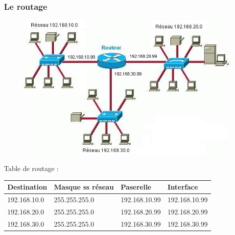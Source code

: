 \begin{frame}\frametitle{Le routage}

    \begin{figure}[H]
        \includegraphics[scale=0.35]{res/routageIP_1.png}
    \end{figure}
    Table de routage :
    \begin{table}[h]
        \begin{tabular}{l|l|l|l}
Destination   & Masque ss réseau  & Paserelle     & Interface   \\ \hline
192.168.10.0  & 255.255.255.0     & 192.168.10.99 & 192.168.10.99\\ \hline
192.168.20.0  & 255.255.255.0     & 192.168.20.99 & 192.168.20.99\\ \hline
192.168.30.0  & 255.255.255.0     & 192.168.30.99 & 192.168.30.99\\ \hline
        \end{tabular}
    \end{table}

\end{frame}


